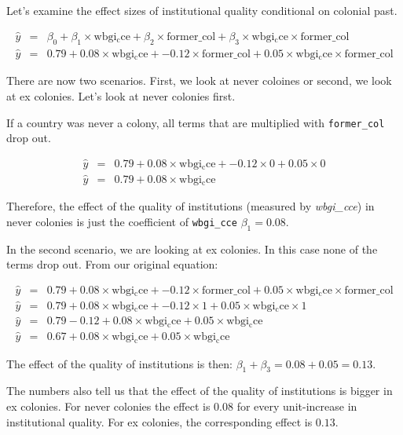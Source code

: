 \documentclass[]{article}
\theoremstyle{definition}
\theoremstyle{definition}
\theoremstyle{definition}
\theoremstyle{remark}
\begin{document}
Let's examine the effect sizes of institutional quality conditional on
colonial past.

\begin{align}
\hat{y} & = & \beta_{0} + \beta_{1} \times \mathrm{wbgi_cce} + \beta_{2} \times \mathrm{former\_col} + \beta_{3} \times \mathrm{wbgi_cce} \times \mathrm{former\_col} \\
\hat{y} & = & 0.79 + 0.08 \times \mathrm{wbgi_cce}  + -0.12 \times \mathrm{former\_col} + 0.05 \times \mathrm{wbgi_cce} \times \mathrm{former\_col} 
\end{align}

There are now two scenarios. First, we look at never coloines or second,
we look at ex colonies. Let's look at never colonies first.

If a country was never a colony, all terms that are multiplied with
\texttt{former\_col} drop out.

\begin{align}
\hat{y} & = & 0.79 + 0.08 \times \mathrm{wbgi_cce} + -0.12 \times 0  + 0.05 \times 0  \\
\hat{y} & = & 0.79 + 0.08 \times \mathrm{wbgi_cce}
\end{align}

Therefore, the effect of the quality of institutions (measured by
\emph{wbgi\_cce}) in never colonies is just the coefficient of
\texttt{wbgi\_cce} \(\beta_1 = 0.08\).

In the second scenario, we are looking at ex colonies. In this case none
of the terms drop out. From our original equation:

\begin{align}
\hat{y} & = & 0.79 + 0.08 \times \mathrm{wbgi_cce} + -0.12 \times \mathrm{former\_col} + 0.05 \times \mathrm{wbgi_cce} \times \mathrm{former\_col} \\
\hat{y} & = & 0.79 + 0.08 \times \mathrm{wbgi_cce} + -0.12 \times 1  + 0.05 \times \mathrm{wbgi_cce} \times 1 \\
\hat{y} & = & 0.79 -0.12 + 0.08 \times \mathrm{wbgi_cce} + 0.05 \times \mathrm{wbgi_cce} \\
\hat{y} & = & 0.67 + 0.08 \times \mathrm{wbgi_cce} + 0.05 \times \mathrm{wbgi_cce}
\end{align}

The effect of the quality of institutions is then:
\(\beta_1 + \beta_3 = 0.08 + 0.05 = 0.13\).

The numbers also tell us that the effect of the quality of institutions
is bigger in ex colonies. For never colonies the effect is \(0.08\) for
every unit-increase in institutional quality. For ex colonies, the
corresponding effect is \(0.13\).
\end{document}

